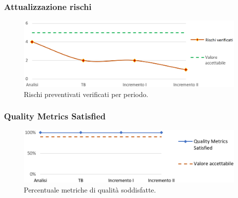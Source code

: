 \newpage

\subsubsection{Attualizzazione rischi}
\begin{figure}[h]
	\centering
	\includegraphics[width=17cm]{Images/rischi}
	\caption{Rischi preventivati verificati per periodo.}
\end{figure}



\subsubsection{Quality Metrics Satisﬁed}
\begin{figure}[h]
	\centering
	\includegraphics[width=16cm]{Images/metriche}
	\caption{Percentuale metriche di qualità soddisfatte.}
\end{figure}


